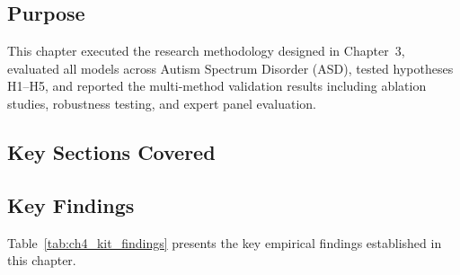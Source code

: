 \iffalse
\subsection{Purpose}

This chapter executed the research methodology designed in Chapter~3, evaluated all models across Autism Spectrum Disorder (ASD), tested hypotheses H1--H5, and reported the multi-method validation results including ablation studies, robustness testing, and expert panel evaluation.

\subsection{Key Sections Covered}

\subsection{Key Findings}
\noindent Table~\ref{tab:ch4_kit_findings} presents the key empirical findings established in this chapter.

